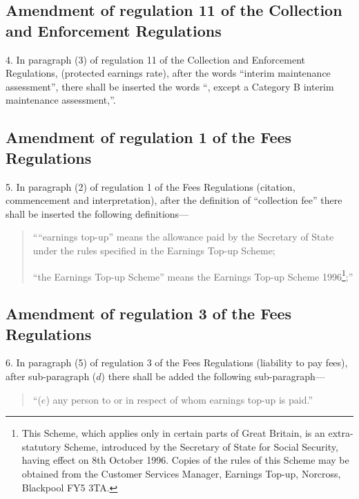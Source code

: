 \documentclass[a4paper]{article}
\begin{document}
\subsection[4. Amendment of regulation 11 of the Collection and Enforcement Regulations]{Amendment of regulation 11 of the Collection and Enforcement Regulations}

4.  In paragraph (3) of regulation 11 of the Collection and Enforcement Regulations, (protected earnings rate), after the words “interim maintenance assessment”, there shall be inserted the words “, except a Category B interim maintenance assessment,”.

\subsection[5. Amendment of regulation 1 of the Fees Regulations]{Amendment of regulation 1 of the Fees Regulations}

5.  In paragraph (2) of regulation 1 of the Fees Regulations (citation, commencement and interpretation), after the definition of “collection fee” there shall be inserted the following definitions—
\begin{quotation}
““earnings top-up” means the allowance paid by the Secretary of State under the rules specified in the Earnings Top-up Scheme;

“the Earnings Top-up Scheme” means the Earnings Top-up Scheme 1996\footnote{\frenchspacing This Scheme, which applies only in certain parts of Great Britain, is an extra-statutory Scheme, introduced by the Secretary of State for Social Security, having effect on 8th October 1996. Copies of the rules of this Scheme may be obtained from the Customer Services Manager, Earnings Top-up, Norcross, Blackpool FY5 3TA.};”
\end{quotation}

\subsection[6. Amendment of regulation 3 of the Fees Regulations]{Amendment of regulation 3 of the Fees Regulations}

6.  In paragraph (5) of regulation 3 of the Fees Regulations (liability to pay fees), after sub-paragraph ($d$) there shall be added the following sub-paragraph—
\begin{quotation}
“($e$) any person to or in respect of whom earnings top-up is paid.”
\end{quotation}
\end{document}
